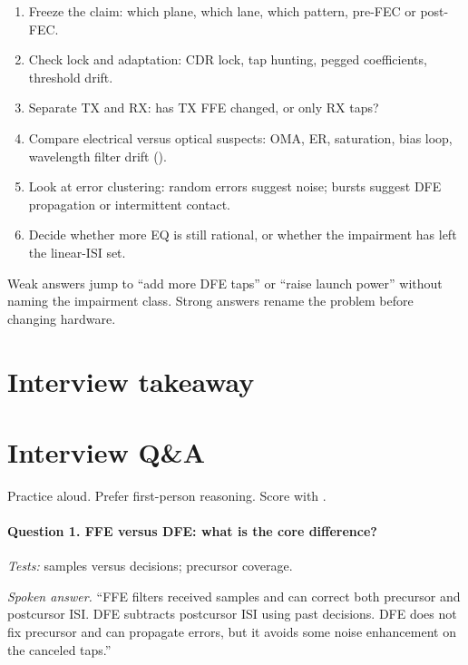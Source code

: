 \begin{enumerate}
\item Freeze the claim: which plane, which lane, which pattern, pre-FEC or
      post-FEC.
\item Check lock and adaptation: CDR lock, tap hunting, pegged coefficients,
      threshold drift.
\item Separate TX and RX: has TX FFE changed, or only RX taps?
\item Compare electrical versus optical suspects: OMA, ER, saturation, bias
      loop, wavelength filter drift ().
\item Look at error clustering: random errors suggest noise; bursts suggest DFE
      propagation or intermittent contact.
\item Decide whether more EQ is still rational, or whether the impairment has
      left the linear-ISI set.
\end{enumerate}

Weak answers jump to ``add more DFE taps'' or ``raise launch power'' without
naming the impairment class. Strong answers rename the problem before changing
hardware.

\section{Interview takeaway}
\label{sec:eq-design-review}


\section{Interview Q\&A}
\label{sec:eq-interview-qa}

Practice aloud. Prefer first-person reasoning. Score with
.

\paragraph{Question 1. FFE versus DFE: what is the core difference?}
\textit{Tests:} samples versus decisions; precursor coverage.

\textit{Spoken answer.}
``FFE filters received samples and can correct both precursor and postcursor
ISI. DFE subtracts postcursor ISI using past decisions. DFE does not fix
precursor and can propagate errors, but it avoids some noise enhancement on the
canceled taps.''

